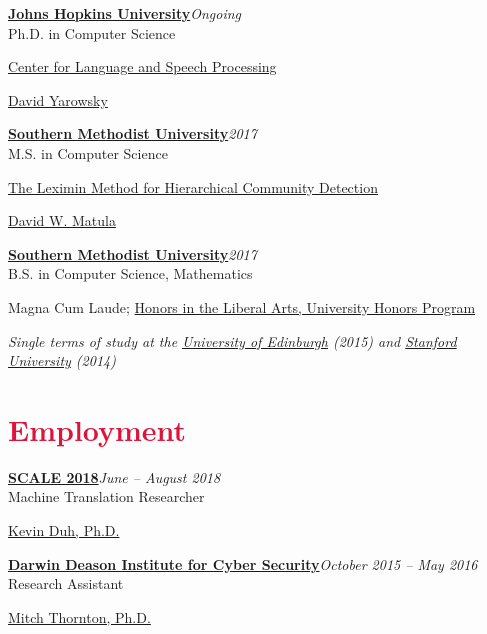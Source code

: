 \documentclass[margin, 10pt]{res} %
\newcommand{\Year}[1]{\emph{#1}}
\newcommand{\uni}[1]{\textbf{#1}}
\newcommand{\eventYear}[2]{\uni{#1}\hfill{\Year{#2}}\\}
\let\oldsection\section
\renewcommand{\section}[1]{\oldsection{\textcolor{crimson}{#1}}}
\newcommand{\JHU}{\href{https://www.jhu.edu/}{Johns Hopkins University}}
\newcommand{\SMU}{\href{https://www.smu.edu/}{Southern Methodist University}}
\newcommand{\HPHS}{\href{http://hs.hpisd.org}{Highland Park High School}}
\newcommand{\STAN}{\href{https://www.stanford.edu/}{Stanford University}}
\newcommand{\UOE}{\href{https://www.ed.ac.uk/}{University of Edinburgh}}
\newcommand{\CLSP}{\href{https://www.clsp.jhu.edu}{Center for Language and Speech Processing}}
\begin{document}
\begin{resume}
\eventYear{\JHU}{Ongoing}
	Ph.D. in Computer Science
	\begin{description}[noitemsep, labelindent=1em]
	\item[Affiliation:] \CLSP
	\item[Advisor:] \href{http://www.cs.jhu.edu/~yarowsky/}{David Yarowsky}
	\end{description}

\eventYear{\SMU}{2017}
	M.S. in Computer Science
	\begin{description}[noitemsep, labelindent=1em]
	\item[Thesis:] \href{https://search.proquest.com/docview/1907180434?pq-origsite=gscholar}{The Leximin Method for Hierarchical Community Detection}
	\item[Advisor:] \href{https://lyle.smu.edu/~matula/}{David W. Matula}
	\end{description}
 
\eventYear{\SMU}{2017}
	B.S. in Computer Science, Mathematics
	\begin{description}[noitemsep, labelindent=0.5em]
	\item Magna Cum Laude; \href{http://www.smu.edu/dedman/studentresources/universityhonors}{Honors in the Liberal Arts, University Honors Program}
	\end{description}
	
	
\emph{Single terms of study at the \UOE{} (2015) and \STAN{} (2014)}



\section{Employment}

\eventYear{\href{https://hltcoe.jhu.edu/research/scale/scale-2018/}{SCALE 2018}}{June -- August 2018}
Machine Translation Researcher
\begin{description}[nosep]
\item[Host:] \href{http://cs.jhu.edu/~kevinduh/}{Kevin Duh, Ph.D.}
\end{description}

\begin{samepage}
\eventYear{\href{https://www.smu.edu/Lyle/Institutes/DeasonInstitute}{Darwin Deason Institute for Cyber Security}}{October 2015 -- May 2016}
Research Assistant
\begin{description}[nosep]
\item[Host:] \href{https://s2.smu.edu/~mitch/}{Mitch Thornton, Ph.D.}
\end{description}
\end{samepage}


\end{resume}
\end{document}
